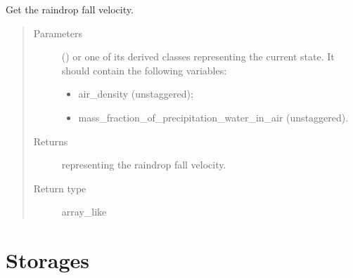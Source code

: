 \documentclass[letterpaper,10pt,english]{sphinxmanual}
\begin{document}
\begin{fulllineitems}
\begin{fulllineitems}
\label{\detokenize{api:parameterizations.slow_tendency_microphysics_kessler_wrf_saturation.SlowTendencyMicrophysicsKesslerWRFSaturation.get_raindrop_fall_velocity}}
Get the raindrop fall velocity.
\begin{quote}\begin{description}
\item[{Parameters}] \leavevmode
{} () \textendash{} 
{\hyperref[\detokenize{api:storages.grid_data.GridData}]{}} or one of its derived classes representing the current state.
It should contain the following variables:
\begin{itemize}
\item {} 
air\_density (unstaggered);

\item {} 
mass\_fraction\_of\_precipitation\_water\_in\_air (unstaggered).

\end{itemize}


\item[{Returns}] \leavevmode
{} representing the raindrop fall velocity.

\item[{Return type}] \leavevmode
array\_like

\end{description}\end{quote}

\end{fulllineitems}


\end{fulllineitems}



\section{Storages}
\label{\detokenize{api:storages}}
\end{document}
